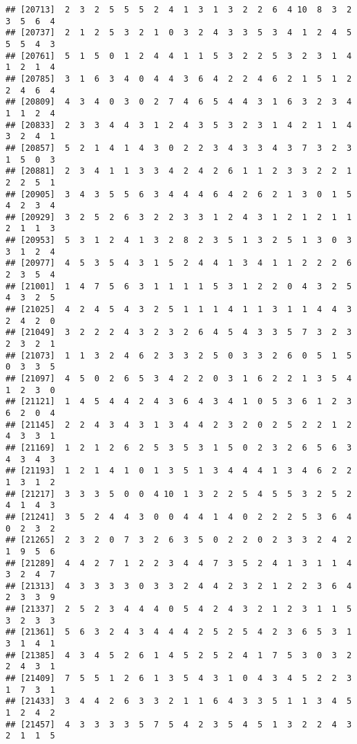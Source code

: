\documentclass[
]{article}
\begin{document}
\begin{verbatim}
## [20713]  2  3  2  5  5  5  2  4  1  3  1  3  2  2  6  4 10  8  3  2  3  5  6  4
## [20737]  2  1  2  5  3  2  1  0  3  2  4  3  3  5  3  4  1  2  4  5  5  5  4  3
## [20761]  5  1  5  0  1  2  4  4  1  1  5  3  2  2  5  3  2  3  1  4  1  2  1  4
## [20785]  3  1  6  3  4  0  4  4  3  6  4  2  2  4  6  2  1  5  1  2  2  4  6  4
## [20809]  4  3  4  0  3  0  2  7  4  6  5  4  4  3  1  6  3  2  3  4  1  1  2  4
## [20833]  2  3  3  4  4  3  1  2  4  3  5  3  2  3  1  4  2  1  1  4  3  2  4  1
## [20857]  5  2  1  4  1  4  3  0  2  2  3  4  3  3  4  3  7  3  2  3  1  5  0  3
## [20881]  2  3  4  1  1  3  3  4  2  4  2  6  1  1  2  3  3  2  2  1  2  2  5  1
## [20905]  3  4  3  5  5  6  3  4  4  4  6  4  2  6  2  1  3  0  1  5  4  2  3  4
## [20929]  3  2  5  2  6  3  2  2  3  3  1  2  4  3  1  2  1  2  1  1  2  1  1  3
## [20953]  5  3  1  2  4  1  3  2  8  2  3  5  1  3  2  5  1  3  0  3  3  1  2  4
## [20977]  4  5  3  5  4  3  1  5  2  4  4  1  3  4  1  1  2  2  2  6  2  3  5  4
## [21001]  1  4  7  5  6  3  1  1  1  1  5  3  1  2  2  0  4  3  2  5  4  3  2  5
## [21025]  4  2  4  5  4  3  2  5  1  1  1  4  1  1  3  1  1  4  4  3  2  4  2  0
## [21049]  3  2  2  2  4  3  2  3  2  6  4  5  4  3  3  5  7  3  2  3  2  3  2  1
## [21073]  1  1  3  2  4  6  2  3  3  2  5  0  3  3  2  6  0  5  1  5  0  3  3  5
## [21097]  4  5  0  2  6  5  3  4  2  2  0  3  1  6  2  2  1  3  5  4  1  2  3  0
## [21121]  1  4  5  4  4  2  4  3  6  4  3  4  1  0  5  3  6  1  2  3  6  2  0  4
## [21145]  2  2  4  3  4  3  1  3  4  4  2  3  2  0  2  5  2  2  1  2  4  3  3  1
## [21169]  1  2  1  2  6  2  5  3  5  3  1  5  0  2  3  2  6  5  6  3  4  3  4  3
## [21193]  1  2  1  4  1  0  1  3  5  1  3  4  4  4  1  3  4  6  2  2  1  3  1  2
## [21217]  3  3  3  5  0  0  4 10  1  3  2  2  5  4  5  5  3  2  5  2  4  1  4  3
## [21241]  3  5  2  4  4  3  0  0  4  4  1  4  0  2  2  2  5  3  6  4  0  2  3  2
## [21265]  2  3  2  0  7  3  2  6  3  5  0  2  2  0  2  3  3  2  4  2  1  9  5  6
## [21289]  4  4  2  7  1  2  2  3  4  4  7  3  5  2  4  1  3  1  1  4  3  2  4  7
## [21313]  4  3  3  3  3  0  3  3  2  4  4  2  3  2  1  2  2  3  6  4  2  3  3  9
## [21337]  2  5  2  3  4  4  4  0  5  4  2  4  3  2  1  2  3  1  1  5  3  2  3  3
## [21361]  5  6  3  2  4  3  4  4  4  2  5  2  5  4  2  3  6  5  3  1  3  1  4  1
## [21385]  4  3  4  5  2  6  1  4  5  2  5  2  4  1  7  5  3  0  3  2  2  4  3  1
## [21409]  7  5  5  1  2  6  1  3  5  4  3  1  0  4  3  4  5  2  2  3  1  7  3  1
## [21433]  3  4  4  2  6  3  3  2  1  1  6  4  3  3  5  1  1  3  4  5  1  2  4  2
## [21457]  4  3  3  3  3  5  7  5  4  2  3  5  4  5  1  3  2  2  4  3  2  1  1  5

\end{verbatim}
\end{document}
